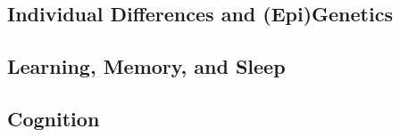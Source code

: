 \subsection*{Individual Differences and (Epi)Genetics}

% 
% 
% 
% 
% 
% 
% 
% 
% 
% 


\subsection*{Learning, Memory, and Sleep}

% 
% 
% 
% 
% 
% 
% 
% 
% 
% 
% 
% 
% 
% 
% 
% 
% 
% 
% 
% 
% 
% 
% 
% 
% 
% 
% 
% 
% 

\subsection*{Cognition}


